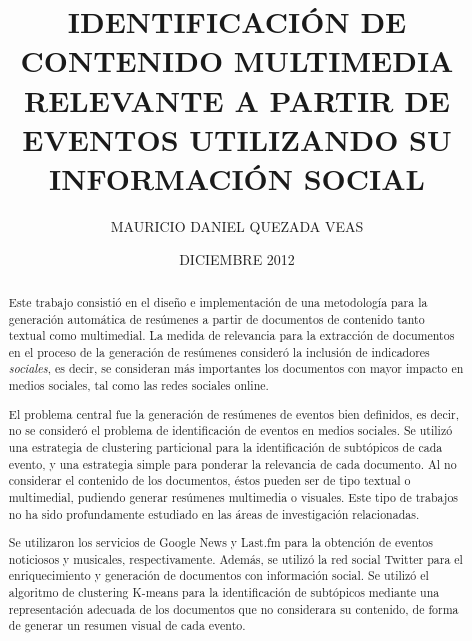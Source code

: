 \documentclass[upright, contnum]{umemoria}
\author{MAURICIO DANIEL QUEZADA VEAS}
\title{IDENTIFICACI\'ON DE CONTENIDO MULTIMEDIA RELEVANTE A PARTIR DE EVENTOS UTILIZANDO SU INFORMACI\'ON SOCIAL}
\date{DICIEMBRE 2012}
\begin{document}
\frontmatter
\maketitle

\begin{abstract}

Este trabajo consistió en el diseño e implementación de una metodología para la generación automática
de resúmenes a partir de documentos de contenido tanto textual como multimedial. La medida de relevancia para
la extracción de documentos en el proceso de la generación de resúmenes consideró la inclusión de indicadores
\textit{sociales}, es decir, se consideran más importantes los documentos con mayor impacto en medios sociales, tal como
las redes sociales online.

El problema central fue la generación de resúmenes de eventos bien definidos, es decir, no se consideró el problema
de identificación de eventos en medios sociales. Se utilizó una estrategia de clustering particional para la identificación
de subtópicos de cada evento, y una estrategia simple para ponderar la relevancia de cada documento. Al no considerar
el contenido de los documentos, éstos pueden ser de tipo textual o multimedial, pudiendo generar resúmenes multimedia o visuales.
Este tipo de trabajos no ha sido profundamente estudiado en las áreas de investigación relacionadas.

Se utilizaron los servicios de Google News y Last.fm para la obtención de eventos noticiosos y musicales, respectivamente.
Además, se utilizó la red social Twitter para el enriquecimiento y generación de documentos con información social. Se utilizó el
algoritmo de clustering K-means para la identificación de subtópicos mediante una representación adecuada de los documentos que
no considerara su contenido, de forma de generar un resumen visual de cada evento.

\end{abstract}



\cleardoublepage
\begin{spacing}{1.5}
\tableofcontents
\end{spacing}
\listoffigures

\mainmatter







\nocite{*}



%
\end{document}
